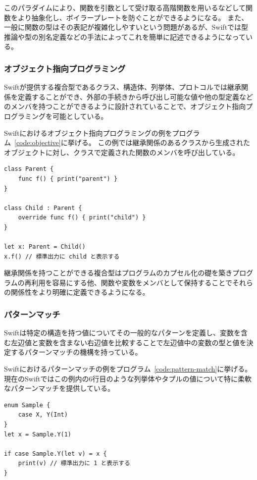 このパラダイムにより、関数を引数として受け取る高階関数を用いるなどして関数をより抽象化し、ボイラープレートを防ぐことができるようになる。
また、一般に関数の型はその表記が複雑化しやすいという問題があるが、Swiftでは型推論や型の別名定義などの手法によってこれを簡単に記述できるようになっている。

\subsubsection{オブジェクト指向プログラミング}

Swiftが提供する複合型であるクラス、構造体、列挙体、プロトコルでは継承関係を定義することができ、外部の手続きから呼び出し可能な値や他の型定義などのメンバを持つことができるように設計されていることで、オブジェクト指向プログラミングを可能としている。

Swiftにおけるオブジェクト指向プログラミングの例をプログラム~\ref{code:objective}に挙げる。
この例では継承関係のあるクラスから生成されたオブジェクトに対し、クラスで定義された関数のメンバを呼び出している。

\begin{lstlisting}[caption=Swiftにおけるオブジェクト指向プログラミングの例, label=code:objective]
class Parent {
    func f() { print("parent") }
}

class Child : Parent {
    override func f() { print("child") }
}

let x: Parent = Child()
x.f() // 標準出力に child と表示する
\end{lstlisting}

継承関係を持つことができる複合型はプログラムのカプセル化の礎を築きプログラムの再利用を容易にする他、関数や変数をメンバとして保持することでそれらの関係性をより明確に定義できるようになる。

\subsubsection{パターンマッチ}

Swiftは特定の構造を持つ値についてその一般的なパターンを定義し、変数を含む左辺値と変数を含まない右辺値を比較することで左辺値中の変数の型と値を決定するパターンマッチの機構を持っている。

Swiftにおけるパターンマッチの例をプログラム~\ref{code:pattern-match}に挙げる。
現在のSwiftではこの例内の6行目のような列挙体やタプルの値について特に柔軟なパターンマッチを提供している。

\begin{lstlisting}[caption=Swiftにおけるパターンマッチの例, label=code:pattern-match]
enum Sample {
    case X, Y(Int)
}
let x = Sample.Y(1)

if case Sample.Y(let v) = x {
    print(v) // 標準出力に 1 と表示する
}
\end{lstlisting}

